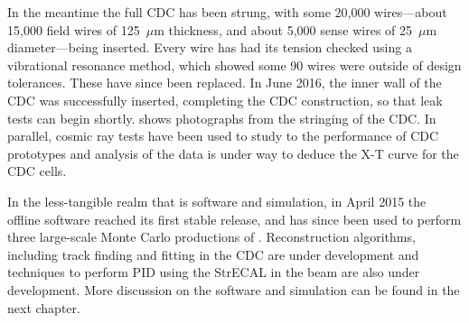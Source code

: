 \FigStatusCyDet
In the meantime the full \ac{CDC} has been strung, with some 20,000 wires---about 15,000 field wires of 125~$\mu$m thickness, and about 5,000 sense wires of 25~$\mu$m diameter---being inserted.
Every wire has had its tension checked using a vibrational resonance method, which showed some 90 wires were outside of design tolerances.  These have since been replaced.
In June 2016, the inner wall of the CDC was successfully inserted, completing the CDC construction, so that leak tests can begin shortly.  
 shows photographs from the stringing of the \ac{CDC}.
In parallel, cosmic ray tests have been used to study to the performance of CDC prototypes and analysis of the data is under way to deduce the X-T curve for the CDC cells.

In the less-tangible realm that is software and simulation, in April 2015 the offline software reached its first stable release, and has since been used to perform three large-scale Monte Carlo productions of \phaseI.
Reconstruction algorithms, including track finding and fitting in the \ac{CDC} are under development and techniques to perform \ac{PID} using the \ac{StrECAL} in the \phaseI beam are also under development.
More discussion on the software and simulation can be found in the next chapter.

